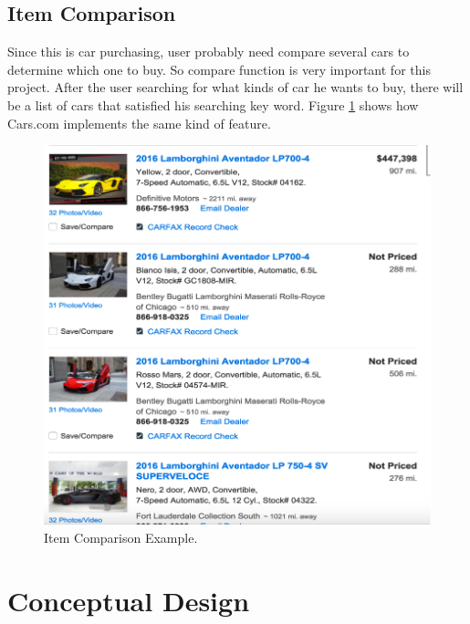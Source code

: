 \documentclass[12pt]{article}
\begin{document}
\subsection{Item Comparison}
Since this is car purchasing, user probably need compare several cars to determine which one to buy. So compare function is very important for this project. After the user searching for what kinds of car he wants to buy, there will be a list of cars that satisfied his searching key word. Figure \ref{car_comparison} shows how Cars.com implements the same kind of feature.
\begin{figure}[!h]
\caption{Item Comparison Example.} \label{car_comparison}
\begin{center}
\includegraphics[width=13cm]{car_comparison}
\end{center}
\end{figure}

\newpage

\section{Conceptual Design}
\end{document}
